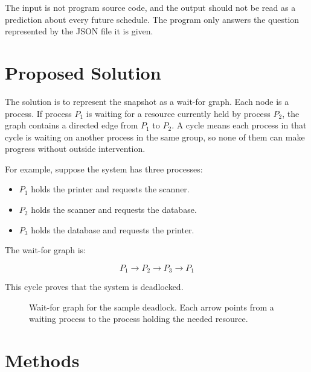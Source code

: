 \documentclass[10pt]{article}
\begin{document}
The input is not program source code, and the output should not be read as a prediction about every future schedule. The program only answers the question represented by the JSON file it is given.

\section{Proposed Solution}

The solution is to represent the snapshot as a wait-for graph. Each node is a process. If process \(P_1\) is waiting for a resource currently held by process \(P_2\), the graph contains a directed edge from \(P_1\) to \(P_2\). A cycle means each process in that cycle is waiting on another process in the same group, so none of them can make progress without outside intervention.

For example, suppose the system has three processes:

\begin{itemize}
  \item \(P_1\) holds the printer and requests the scanner.
  \item \(P_2\) holds the scanner and requests the database.
  \item \(P_3\) holds the database and requests the printer.
\end{itemize}

The wait-for graph is:

\[
P_1 \rightarrow P_2 \rightarrow P_3 \rightarrow P_1
\]

This cycle proves that the system is deadlocked.

\begin{figure}[H]
\centering
{}
\caption{Wait-for graph for the sample deadlock. Each arrow points from a waiting process to the process holding the needed resource.}
\end{figure}

\section{Methods}
\end{document}
